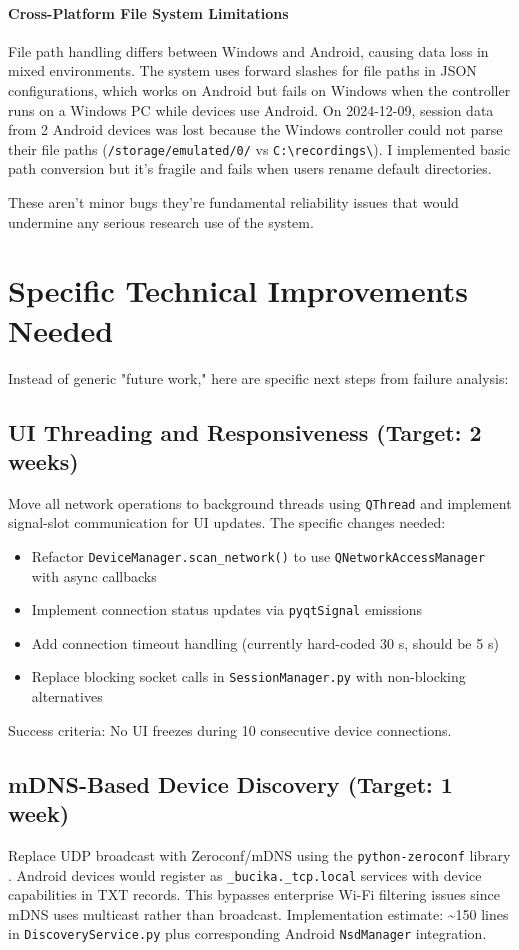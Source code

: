 \paragraph{\textbf{Cross-Platform File System Limitations}} File path handling differs between Windows and Android, causing data loss in mixed environments. The system uses forward slashes for file paths in JSON configurations, which works on Android but fails on Windows when the controller runs on a Windows PC while devices use Android. On 2024-12-09, session data from 2 Android devices was lost because the Windows controller could not parse their file paths (\verb|/storage/emulated/0/| vs \verb|C:\recordings\|). I implemented basic path conversion but it's fragile and fails when users rename default directories.

These aren't minor bugs \textemdash they're fundamental reliability issues that would undermine any serious research
use of the system.


\section{Specific Technical Improvements Needed}

Instead of generic "future work," here are specific next steps from failure analysis:

\subsection{UI Threading and Responsiveness (Target: 2 weeks)}
Move all network operations to background threads using \texttt{QThread} and implement signal-slot communication for UI updates. The specific changes needed:
\begin{itemize}
    \item Refactor \texttt{DeviceManager.scan\_network()} to use \texttt{QNetworkAccessManager} with async callbacks
    \item Implement connection status updates via \texttt{pyqtSignal} emissions
    \item Add connection timeout handling (currently hard-coded 30 s, should be 5 s)
    \item Replace blocking socket calls in \texttt{SessionManager.py} with non-blocking alternatives
\end{itemize}
Success criteria: No UI freezes during 10 consecutive device connections.

\subsection{mDNS-Based Device Discovery (Target: 1 week)}
Replace UDP broadcast with Zeroconf/mDNS using the \texttt{python-zeroconf} library \cite{ref19}. Android devices would register as \texttt{\_bucika.\_tcp.local} services with device capabilities in TXT records. This bypasses enterprise Wi-Fi filtering issues since mDNS uses multicast rather than broadcast. Implementation estimate: \textasciitilde{}150 lines in \texttt{DiscoveryService.py} plus corresponding Android \texttt{NsdManager} integration.

